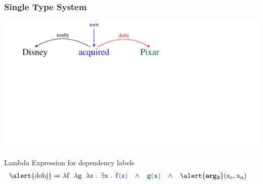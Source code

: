\documentclass[mathserif,12pt]{beamer}
\newcommand{\hlight}[1]{{\color{blue!80} #1}}
\renewcommand{\land}{\wedge}
\newcommand{\lspace}{.\,}
\begin{document}
\begin{frame}
\frametitle{Single Type System}
\vspace{-2.4em}
\begin{center}
\includegraphics[trim=2em 9.4em 10em 0em,clip=true,scale=1.3]{figures/pixar_dobj}

\end{center}

\vspace{1cm}

\begin{block}{\centering Lambda Expression for dependency labels}
\vspace{-0.5cm}
\begin{align*}
  \hbox{\alert{dobj}} & \Rightarrow  \lambda \hlight{\mathbf{f}}\;\; \lambda {\color{blue!40!green!60!black} \mathbf{g}}\;\; \lambda \hlight{\mathbf{z}}\; \lspace \; \exists {\color{blue!40!green!60!black} \mathbf{x}}\; \lspace \; \hlight{\mathbf{f(z)}}\;\;\; \land \;\;\; {\color{blue!40!green!60!black} \mathbf{g(x)}}  \;\;\; \land\;\;\; \alert{\mathbf{arg_2}}(\hlight{\mathbf{z_e}}, {\color{blue!40!green!60!black} \mathbf{x_a}})
\end{align*}
\vspace{-0.5cm}
\end{block}
\end{frame}
\end{document}
